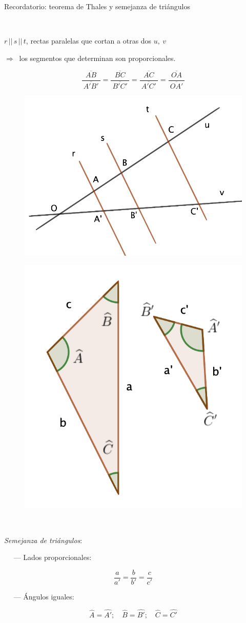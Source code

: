 \begin{myexampleblock}{Recordatorio: teorema de Thales y semejanza de triángulos}
	
\begin{multicols}{2}
$\quad$

$r \, || \, s\, || \, t$, rectas paralelas que cortan a otras dos $u,\ v$ 

$\Rightarrow \ $ los segmentos que determinan son proporcionales.

$$\dfrac{\ \overline{AB}\ }{\ \overline{A'B'} \ }=\dfrac{\ \overline{BC}\ }{\ \overline{B'C'}\ }=\dfrac{\ \overline{AC}\ }{\ \overline{A'C'}\ }=\dfrac{\ \overline{OA}\ }{\ \overline{OA'}\ }$$
\begin{figure}[H]
	\centering
	\includegraphics[width=.4\textwidth]{img-rt/rt36.png}
\end{figure}	
\end{multicols}

\begin{multicols}{2}
\begin{figure}[H]
	\centering
	\includegraphics[width=.35\textwidth]{img-rt/rt37.png}
\end{figure}	
$\quad$

\emph{Semejanza de triángulos}:

$\quad$ --- Lados proporcionales:

$$\dfrac{a}{a'}=\dfrac{b}{b'}=\dfrac{c}{c'}$$

$\quad$ --- Ángulos iguales:

$$\widehat{A}=\widehat{A'};\quad \widehat{B}=\widehat{B'}; \quad \widehat{C}=\widehat{C'}$$
\end{multicols}


\end{myexampleblock}
